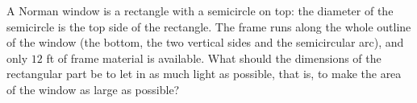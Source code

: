 A Norman window is a rectangle with a semicircle on top: the diameter of the semicircle is the top side of the rectangle. The frame runs along the whole outline of the window (the bottom, the two vertical sides and the semicircular arc), and only $12$ ft of frame material is available. What should the dimensions of the rectangular part be to let in as much light as possible, that is, to make the area of the window as large as possible?
